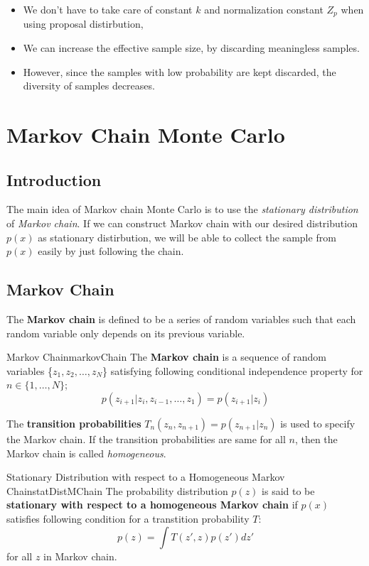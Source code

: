 \documentclass{article}
\begin{document}
        \begin{itemize}
            \item We don't have to take care of constant $k$ and normalization constant $Z_p$ when using proposal distirbution,
            \item We can increase the effective sample size, by discarding meaningless samples.
            \item However, since the samples with low probability are kept discarded, the diversity of samples decreases.
        \end{itemize}

\section{Markov Chain Monte Carlo}
    \subsection{Introduction}
        The main idea of Markov chain Monte Carlo is to use the \emph{stationary distribution} of \emph{Markov chain}. If we can
        construct Markov chain with our desired distribution $p(x)$ as stationary distirbution, we will be able to collect the sample from $p(x)$
        easily by just following the chain.

    \subsection{Markov Chain}
        The \textbf{Markov chain} is defined to be a series of random variables such that each random variable only depends on its previous variable.
        \begin{defn}{Markov Chain}{markovChain}
            The \textbf{Markov chain} is a sequence of random variables \{$z_1, z_2, \dots, z_N$\}
            satisfying following conditional independence property for $n \in \{1,\dots,N\}$;
            \[
            p(z_{i+1}|z_i, z_{i-1}, \dots, z_1)=p(z_{i+1}|z_i)
            \]

            The \textbf{transition probabilities} $T_n(z_n, z_{n+1}) = p(z_{n+1}|z_{n})$ is used to specify the Markov chain. If the transition probabilities
            are same for all $n$, then the Markov chain is called \emph{homogeneous}.
        \end{defn}

        \begin{defn}{Stationary Distribution with respect to a Homogeneous Markov Chain}{statDistMChain}
            The probability distribution $p(z)$ is said to be \textbf{stationary with respect to a homogeneous Markov chain}
            if $p(x)$ satisfies following condition for a transtition probability $T$:
            \[
            p(z)=\int T(z', z)p(z')dz'
            \]
            for all $z$ in Markov chain.
        \end{defn}
\end{document}

